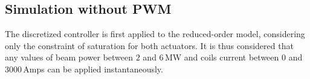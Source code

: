 \documentclass[12pt]{iopart}
\begin{document}
\subsection{Simulation without PWM}
\label{noPWM}

The discretized controller is first applied to the reduced-order model, considering only the constraint of saturation for both actuators. It is thus considered that any values of beam power between $2$ and $6$\,MW and coils current between $0$ and $3000$\,Amps can be applied instantaneously.   

\end{document}
